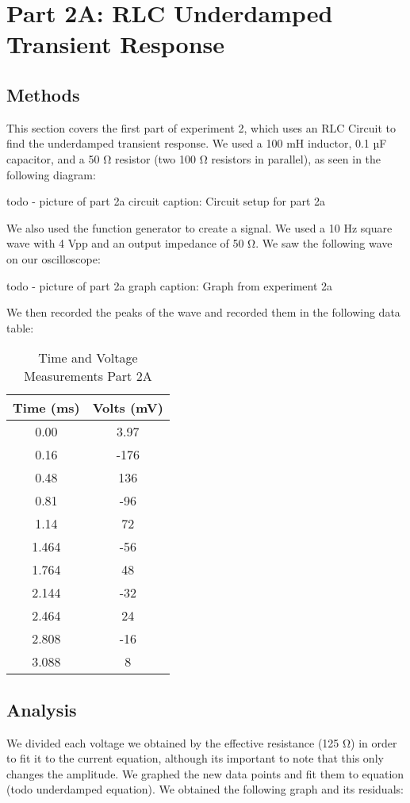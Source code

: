 \documentclass[11pt]{article}
\let\oldsection\section
\renewcommand\section{\clearpage\oldsection}
\begin{document}
    \section{Part 2A: RLC Underdamped Transient Response}\label{sec:part2a_underdamped}
    \subsection{Methods}\label{subsec:part2a_methods}
    This section covers the first part of experiment 2, which uses an RLC Circuit to find the underdamped transient response. We used a 100 mH inductor, 0.1 µF capacitor, and a 50 Ω resistor (two 100 Ω resistors in parallel), as seen in the following diagram:

    todo - picture of part 2a circuit
    caption: Circuit setup for part 2a

    We also used the function generator to create a signal. We used a 10 Hz square wave with 4 Vpp and an output impedance of 50 Ω. We saw the following wave on our oscilloscope:

    todo - picture of part 2a graph
    caption: Graph from experiment 2a

    We then recorded the peaks of the wave and recorded them in the following data table:

    \begin{table}[h]
    \centering
    \caption{Time and Voltage Measurements Part 2A}
    \begin{tabular}{cc}
    \toprule
    \textbf{Time (ms)} & \textbf{Volts (mV)} \\
    \midrule
    0.00 & 3.97 \\
    0.16 & -176 \\
    0.48 & 136 \\
    0.81 & -96 \\
    1.14 & 72 \\
    1.464 & -56 \\
    1.764 & 48 \\
    2.144 & -32 \\
    2.464 & 24 \\
    2.808 & -16 \\
    3.088 & 8 \\
    \bottomrule
    \end{tabular}
    \end{table}

    
    
    \subsection{Analysis}\label{subsec:part2a_analysis}
    We divided each voltage we obtained by the effective resistance (125 Ω)  in order to fit it to the current equation, although its important to note that this only changes the amplitude. We graphed the new data points and fit them to equation (todo underdamped equation). We obtained the following graph and its residuals: 
\end{document}
